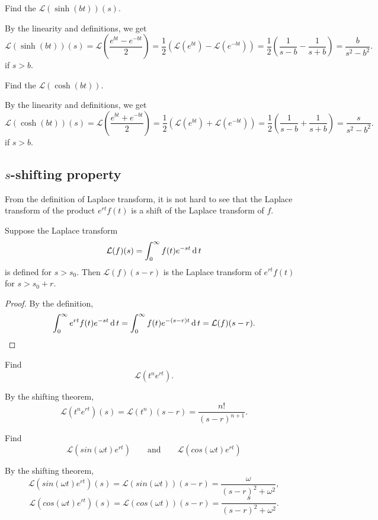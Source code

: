 \begin{example}
  Find the $\mathcal{L}(\sinh(bt))(s)$.
\end{example}
\begin{solution}
  By the linearity and definitions, we get
  \[
    \mathcal{L}(\sinh(bt))(s)=\mathcal{L}\left(\frac{e^{bt}-e^{-bt}}{2}\right)=\frac12\left(\mathcal{L}(e^{bt})-\mathcal{L}(e^{-bt})\right)=\frac12\left(\frac{1}{s-b}-\frac{1}{s+b}\right)=\frac{b}{s^2-b^2}.
  \]
  if $s>b$.
\end{solution}

\begin{exercise}
  Find the $\mathcal{L}(\cosh(bt))$.
\end{exercise}
\begin{exersol}
  By the linearity and definitions, we get
  \[
    \mathcal{L}(\cosh(bt))(s)=\mathcal{L}\left(\frac{e^{bt}+e^{-bt}}{2}\right)=\frac12\left(\mathcal{L}(e^{bt})+\mathcal{L}(e^{-bt})\right)=\frac12\left(\frac{1}{s-b}+\frac{1}{s+b}\right)=\frac{s}{s^2-b^2}.
  \]
  if $s>b$.
\end{exersol}

\subsection*{$s$-shifting property}

From the definition of Laplace transform, it is not hard to see that the Laplace transform of the product $e^{rt}f(t)$ is a shift of the Laplace transform of $f$.

\begin{theorem}
Suppose the Laplace transform 
  \[\mathcal{L}(f)(s)=\int_0^\infty f(t)e^{-st} \operatorname{d} t\]
  is defined for $s>s_0$. Then
  $\mathcal{L}(f)(s-r)$ is the Laplace transform of $e^{rt}f(t)$ for $s >s_0+r$.
\end{theorem}
\begin{proof}
  By the definition,
  \[\int_0^\infty e^{rt}f(t)e^{-st}\operatorname{d} t=\int_0^\infty f(t)e^{-(s-r)t}\operatorname{d} t=\mathcal{L}(f)(s-r).
  \]
\end{proof}

\begin{example}
Find
\[\mathcal{L}(t^ne^{rt}).\]
\end{example}
\begin{solution}
  By the shifting theorem,
  \[\mathcal{L}(t^ne^{rt})(s)=\mathcal{L}(t^n)(s-r)=\frac{n!}{(s-r)^{n+1}}.\]
\end{solution}

\begin{exercise}
  Find 
  \[\mathcal{L}(sin(\omega t)e^{rt})\qquad\text{and}\qquad \mathcal{L}(cos(\omega t)e^{rt})\]
\end{exercise}
\begin{exersol}
  By the shifting theorem,
  \[\mathcal{L}(sin(\omega t)e^{rt})(s)=\mathcal{L}(sin(\omega t))(s-r)=\frac{\omega}{(s-r)^2+\omega^2},\]
  \[\mathcal{L}(cos(\omega t)e^{rt})(s)=\mathcal{L}(cos(\omega t))(s-r)=\frac{s}{(s-r)^2+\omega^2}.\]
\end{exersol}


